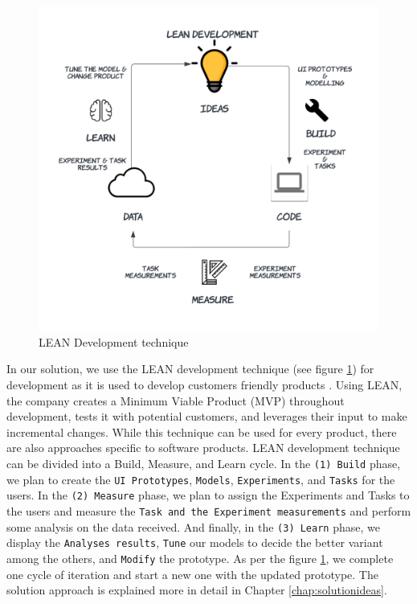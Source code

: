 \begin{figure}[ht]
    \centering
    \includegraphics[scale=0.15]{images/solution-ideas/LEAN.png}
    \caption{LEAN Development technique}
    \label{intro:fig:lean}
\end{figure}

In our solution, we use the LEAN development technique (see figure \ref{intro:fig:lean}) for development as it is used to develop customers friendly products \cite{article:lean:hart}.
Using LEAN, the company creates a Minimum Viable Product (MVP) throughout development, tests it with potential customers, and leverages their input to make incremental changes.
While this technique can be used for every product, there are also approaches specific to software products.
LEAN development technique can be divided into a Build, Measure, and Learn cycle. 
In the \texttt{(1) Build} phase, we plan to create the \texttt{UI Prototypes}, \texttt{Models}, \texttt{Experiments}, and \texttt{Tasks} for the users.
In the \texttt{(2) Measure} phase, we plan to assign the Experiments and Tasks to the users and measure the \texttt{Task and the Experiment measurements} and perform some analysis on the data received. 
And finally, in the \texttt{(3) Learn} phase, we display the \texttt{Analyses results}, \texttt{Tune} our models to decide the better variant among the others, and \texttt{Modify} the prototype.
As per the figure \ref{intro:fig:lean}, we complete one cycle of iteration and start a new one with the updated prototype.
The solution approach is explained more in detail in Chapter \ref{chap:solutionideas}.

